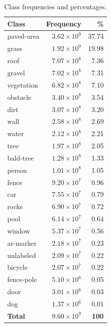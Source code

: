 \documentclass[a4paper]{article}
\begin{document}
\begin{table}[htbp]
    \centering
    \small
    \setlength{\tabcolsep}{5pt} %
    \begin{tabular}{|l|r|r|}
    \hline
    \textbf{Class} & \textbf{Frequency} & \textbf{\%} \\ \hline
    paved-area     & $3.62 \times 10^9$ & 37.74 \\ \hline
    grass          & $1.92 \times 10^9$ & 19.98 \\ \hline
    roof           & $7.07 \times 10^8$ & 7.36 \\ \hline
    gravel         & $7.02 \times 10^8$ & 7.31 \\ \hline
    vegetation     & $6.82 \times 10^8$ & 7.10 \\ \hline
    obstacle       & $3.40 \times 10^8$ & 3.54 \\ \hline
    dirt           & $3.07 \times 10^8$ & 3.20 \\ \hline
    wall           & $2.58 \times 10^8$ & 2.69 \\ \hline
    water          & $2.12 \times 10^8$ & 2.21 \\ \hline
    tree           & $1.97 \times 10^8$ & 2.05 \\ \hline
    bald-tree      & $1.28 \times 10^8$ & 1.33 \\ \hline
    person         & $1.01 \times 10^8$ & 1.05 \\ \hline
    fence          & $9.20 \times 10^7$ & 0.96 \\ \hline
    car            & $7.55 \times 10^7$ & 0.79 \\ \hline
    rocks          & $6.90 \times 10^7$ & 0.72 \\ \hline
    pool           & $6.14 \times 10^7$ & 0.64 \\ \hline
    window         & $5.37 \times 10^7$ & 0.56 \\ \hline
    ar-marker      & $2.18 \times 10^7$ & 0.23 \\ \hline
    unlabeled      & $2.09 \times 10^7$ & 0.22 \\ \hline
    bicycle        & $2.07 \times 10^7$ & 0.22 \\ \hline
    fence-pole     & $5.10 \times 10^6$ & 0.05 \\ \hline
    door           & $3.01 \times 10^6$ & 0.03 \\ \hline
    dog            & $1.37 \times 10^6$ & 0.01 \\ \hline \hline
    \textbf{Total} & \textbf{$9.60 \times 10^9$} & \textbf{100}  \\ \hline 
    \end{tabular}
    \caption{Class frequencies and percentages.}
    \label{table:class_frequencies}
\end{table}
\end{document}

